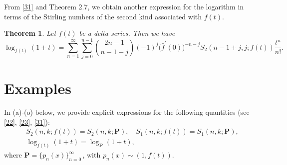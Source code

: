 \documentclass[a4paper,11pt]{amsart}
\newtheorem{theorem}{Theorem}[section]
\begin{document}
From \eqref{31} and Theorem 2.7, we obtain another expression for the logarithm in terms of the Stirling numbers of the second kind associated with $f(t)$.
\begin{theorem}
Let $f(t)$ be a delta series. Then we have
\begin{equation*}
\log_{f(t)}(1+t)=\sum_{n=1}^{\infty}\sum_{j=0}^{n-1}\binom{2n-1}{n-1-j}(-1)^{j}\big(\bar{f}^{\prime}(0)\big)^{-n-j}S_{2}(n-1+j,j; f(t))\frac{t^{n}}{n!}.
\end{equation*}
\end{theorem}

\section{Examples}
In (a)-(o) below, we provide explicit expressions for the following quantities (see \eqref{22}, \eqref{23}, \eqref{31}):
\begin{align*}
&S_{2}(n,k; f(t))=S_{2}(n,k; \mathbf{P}),\quad S_{1}(n,k; f(t))=S_{1}(n,k; \mathbf{P}), \\ &\log_{f(t)}(1+t)=\log_{\mathbf{P}}(1+t),
\end{align*}
where $\mathbf{P}=\{p_{n}(x)\}_{n=0}^{\infty}$\,, with $p_{n}(x) \sim (1, f(t))$.
\end{document}
